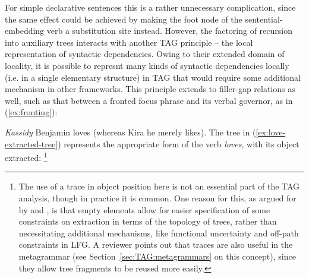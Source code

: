 \documentclass[output=paper,hidelinks]{langscibook}
\begin{document}
%
For simple declarative sentences this is a rather unnecessary complication,
since the same effect could be achieved by making the foot node of the
sentential-embedding verb a substitution site instead. However, the factoring of
recursion into auxiliary trees interacts with another TAG principle -- the local
representation of syntactic dependencies. Owing to their extended domain of
locality, it is possible to represnt many kinds of syntactic dependencies
locally (i.e. in a single elementary structure) in TAG that would require some
additional mechanism in other frameworks. This principle extends to filler-gap
relations as well, such as that between a fronted focus phrase and its verbal
governor, as in (\ref{ex:fronting}):

\ea\label{ex:fronting}
\textit{Kassidy} Benjamin loves (whereas Kira he merely likes).
\z
%
The tree in (\ref{ex:love-extracted-tree}) represents the appropriate form of
the verb \textit{loves}, with its object extracted:%
%
\footnote{The use of a trace in object position here is not an essential part of
  the TAG analysis, though in practice it is common. One reason for this, as
  argued for by \citet{kroch:subjacency} and \citet{kroch:linguisticrelevance},
  is that empty elements allow for easier specification of some constraints on
  extraction in terms of the topology of trees, rather than necessitating
  additional mechanisms, like functional uncertainty and off-path constraints in
  LFG. A reviewer points out that traces are also useful in the metagrammar (see
  Section~\ref{sec:TAG:metagrammars} on this concept), since they allow tree
  fragments to be reused more easily.}
\end{document}
